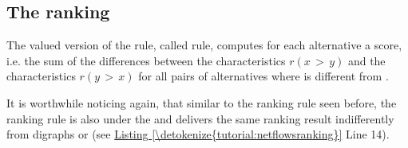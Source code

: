 \documentclass[a4paper,12pt,english]{sphinxhowto}
\begin{document}
\subsection{The  ranking}
\label{\detokenize{tutorial:the-netflows-ranking}}\label{\detokenize{tutorial:netflows-ranking-label}}
The valued version of the  rule, called  rule, computes for each alternative  a  score,  i.e. the sum of the differences between the  characteristics \(r(x\, > \,y)\) and the  characteristics \(r(y\, > \,x)\) for all pairs of alternatives where  is different from .
\def\sphinxLiteralBlockLabel{\label{\detokenize{tutorial:netflowsranking}}}
\begin{sphinxVerbatim}[commandchars=\\\{\},numbers=left,firstnumber=1,stepnumber=1]
   
  
\end{sphinxVerbatim}

It is worthwhile noticing again, that similar to the  ranking rule seen before, the  ranking rule is also  under the {\hyperref[\detokenize{tutorial:codual-transform-label}]{}} and delivers the same ranking result indifferently from digraphs  or  (see \hyperref[\detokenize{tutorial:netflowsranking}]{Listing \ref{\detokenize{tutorial:netflowsranking}}} Line 14).
\end{document}
